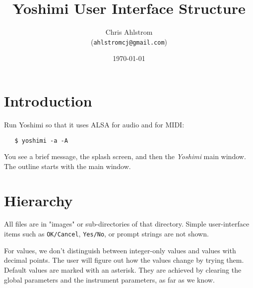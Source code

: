 \documentclass[
 11pt,
 twoside,
 a4paper,
 headinclude,
 footinclude,
 final                                 %
]{article}
\begin{document}
\title{Yoshimi User Interface Structure}
\author{Chris Ahlstrom\\
   (\texttt{ahlstromcj@gmail.com})}
\date{\today}
\maketitle



\setlength{\parindent}{0pt}


\section{Introduction}

Run Yoshimi so that it uses ALSA for audio and for MIDI:

\begin{verbatim}
   $ yoshimi -a -A
\end{verbatim}

You see a brief message, the splash screen, and then the
\textsl{Yoshimi} main window. The outline starts with the main window.

\section{Hierarchy}


All files are in "images" or sub-directories of that directory.
Simple user-interface items such as
\texttt{OK/Cancel}, \texttt{Yes/No}, or prompt strings
are not shown.

For values, we don't distinguish between integer-only values and values with
decimal points.  The user will figure out how the values change by trying
them.  Default values are marked with an asterisk.  They are achieved
by clearing the global parameters and the instrument parameters, as far as
we know.
\end{document}
